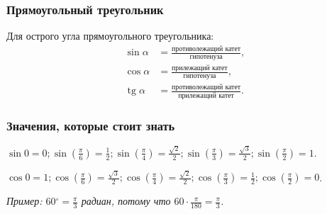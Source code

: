 \documentclass[12pt,a4paper]{article}
\theoremstyle{definition}
\theoremstyle{plain}
\theoremstyle{remark}
\begin{document}
\subsubsection*{Прямоугольный треугольник}
Для острого угла прямоугольного треугольника:
\[
\begin{aligned}
\sin\alpha&=\frac{\text{противолежащий катет}}{\text{гипотенуза}},\\
\cos\alpha&=\frac{\text{прилежащий катет}}{\text{гипотенуза}},\\
\operatorname{tg}\alpha&=\frac{\text{противолежащий катет}}{\text{прилежащий катет}}.
\end{aligned}
\]

\subsubsection*{Значения, которые стоит знать}
\(\sin  0 = 0;\allowbreak \sin  (\frac{\pi }{6}) = \frac{1}{2};\allowbreak \sin  (\frac{\pi }{4}) = \frac{\sqrt{2}}{2};\allowbreak \sin  (\frac{\pi }{3}) = \frac{\sqrt{3}}{2};\allowbreak \sin  (\frac{\pi }{2}) = 1\).\par
\(\cos  0 = 1;\allowbreak \cos  (\frac{\pi }{6}) = \frac{\sqrt{3}}{2};\allowbreak \cos  (\frac{\pi }{4}) = \frac{\sqrt{2}}{2};\allowbreak \cos  (\frac{\pi }{3}) = \frac{1}{2};\allowbreak \cos  (\frac{\pi }{2}) = 0\).\par
{\small\textit{Пример: \(60 {}^{\circ} = \frac{\pi }{3}\) радиан, потому что \(60 \cdot  \frac{\pi }{180} = \frac{\pi }{3}\).}}\par
\end{document}
